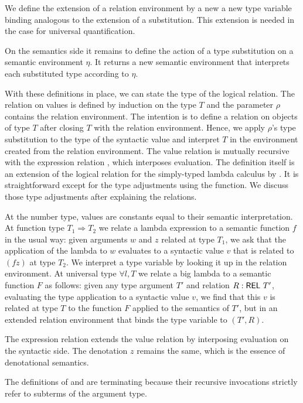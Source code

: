 \documentclass[acmsmall,anonymous,review,screen]{acmart}
\begin{document}
We define the extension of a relation environment by a new a new type
variable binding analogous to the extension
of a substitution. This extension is needed in the case for universal
quantification.
\LogicalREext

On the semantics side it remains to define the action of a type
substitution on a semantic environment $\eta$. It returns a new
semantic environment that interprets each substituted type according
to $\eta$.
\TFsubstToEnv

With these definitions in place, we can state the type of the logical relation.
\LogicalMCVType
The  relation {\AVSem} on values is defined by induction on the type $T$ and the parameter
$\rho$ contains the relation environment. The intention is to define a
relation on objects of type $T$ after closing $T$ with the relation
environment. Hence, we apply $\rho$'s type substitution to the type of
the syntactic value and interpret $T$ in the environment created from
the relation environment.
The value relation is mutually recursive with the expression relation
{\AESem}, which interposes evaluation.
\LogicalMCVBody
The definition itself is an extension of the logical relation for the
simply-typed lambda calculus by
\citet{DBLP:journals/jar/BentonHKM12}. It is straightforward
except for the type adjustments using the {\Asubst} function. We
discuss those type adjustments after explaining the relations.

At the number type, values are constants equal to their semantic
interpretation. 
 At function type $T_1 \Rightarrow T_2$ we relate a lambda expression
to a semantic function $f$ in
the usual way: given arguments $w$ and $z$ related at type $T_1$, we ask that the
application of the lambda to $w$ evaluates to a syntactic value $v$ that is
related to $(f z)$ at type $T_2$.
We interpret a type variable by looking it up in the relation
environment.
At universal type $\forall l, T$ we relate a big lambda to a semantic
function $F$ as follows: given any type argument $T'$ and relation $R :
\AREL\ T'$, evaluating the type application to a syntactic value $v$,
we find that this $v$ is related at type $T$ to the
function $F$ applied to the semantics of $T'$, but in an extended
relation environment that binds the type variable to $(T', R)$.

The expression relation extends the value relation by interposing
evaluation on the syntactic side. The denotation $z$ remains the
same, which is the essence of denotational semantics. 
\LogicalMCE

The definitions of {\AVSem} and {\AESem} are terminating because their
recursive invocations strictly refer to subterms of the argument type.
\end{document}
